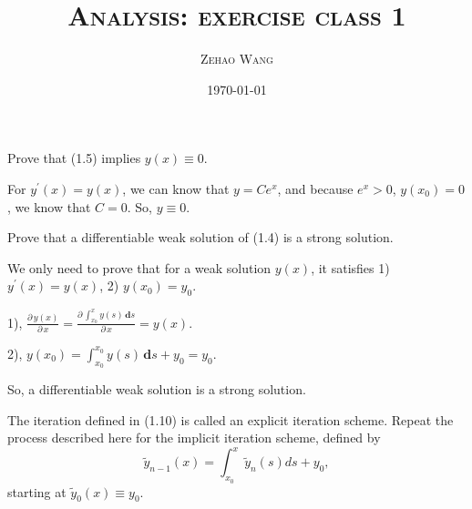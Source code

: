 \documentclass[en, normal, 12pt, black]{elegantnote}
\title{\textsc{Analysis: exercise class 1}}
\author{\textsc{Zehao Wang}}
\date{\today}
\newenvironment{exercise}[1]{\begin{tcolorbox}[colback=black!15, colframe=black!80, title=#1]}{\end{tcolorbox}}
\renewenvironment{proof}{\begin{tcolorbox}[colback=white, colframe=black!50, title=Proof. ]\setlength{\parskip}{0.8em}}{\end{tcolorbox}}
\newcommand{\pder}{\partial\,}
\newcommand{\der}{\,\mathbf{d}}
\begin{document}
\maketitle
    \begin{exercise}{1.1.}
        Prove that (1.5) implies \(y(x)\equiv0\).  
    \end{exercise}
    \begin{proof}
        For \(y^\prime(x)=y(x)\), we can know that \(y=Ce^x\), and because \(e^x>0\), \(y(x_0)=0\), we know that $C=0$. So, \(y\equiv 0\). 
    \end{proof}

    \begin{exercise}{1.4.}
        Prove that a differentiable weak solution of (1.4) is a strong solution. 
    \end{exercise}
    \begin{proof}
        We only need to prove that for a weak solution \(y(x)\), it satisfies 1) \(y^\prime(x)=y(x)\), 2) \(y(x_0)=y_0\). 

        1), \(\frac{\pder y(x)}{\pder x}=\frac{\pder \int_{x_0}^{x}y(s)\der s}{\pder x}=y(x)\). 

        2), \(y(x_0)=\int_{x_0}^{x_0}y(s)\der s+y_0=y_0\). 

        So, a differentiable weak solution is a strong solution. 
    \end{proof}

    \begin{exercise}{1.5.}
        The iteration defined in (1.10) is called an explicit iteration scheme. Repeat the process described here for the implicit iteration scheme, defined by
        \[\widetilde{y}_{n-1}(x)=\int_{x_{0}}^{x} \widetilde{y}_{n}(s) d s+y_{0}, \]
        starting at $\widetilde{y}_0(x)\equiv {y}_0$. 
    \end{exercise}
\end{document}
